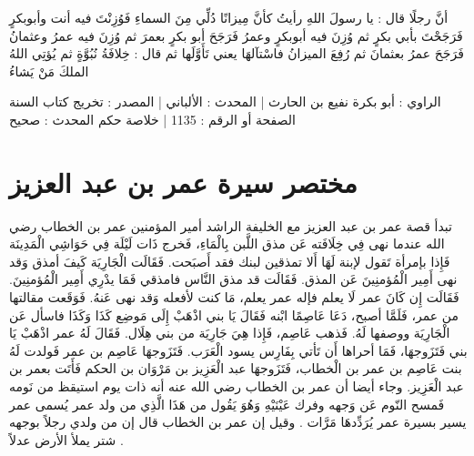 أنَّ رجلًا قال : يا رسولَ اللهِ رأيتُ كأنَّ مِيزانًا دُلِّي مِنَ السماءِ فَوُزِنْتَ فيه أنت وأبوبكرٍ فَرَجَحْتَ بأبي بكرٍ ثم وُزِنَ فيه أبوبكرٍ وعمرُ فَرَجَحَ أبو بكرٍ بعمرَ ثم وُزِنَ فيه عمرُ وعثمانُ فَرَجَحَ عمرُ بعثمانَ ثم رُفِعَ الميزانُ فاسْتآلهَا يعني تَأَوَّلَها ثم قال : خِلافَةُ نُبُوَّةٍ ثم يُؤتِي اللهُ الملكَ مَنْ يَشاءُ

الراوي : أبو بكرة نفيع بن الحارث | المحدث : الألباني | المصدر : تخريج كتاب السنة
الصفحة أو الرقم : 1135 | خلاصة حكم المحدث : صحيح 

\section{مختصر سيرة عمر بن عبد العزيز}

تبدأ قصة عمر بن عبد العزيز مع الخليفة الراشد أمير المؤمنين عمر بن الخطاب رضي الله عندما نهى فِي خِلَافَته عَن مذق اللَّبن بِالْمَاءِ، فَخرج ذَات لَيْلَة فِي حَوَاشِي الْمَدِينَة فَإِذا بإمرأة تَقول لإبنة لَهَا أَلا تمذقين لبنك فقد أَصبَحت. فَقَالَت الْجَارِيَة كَيفَ أمذق وَقد نهى أَمِير الْمُؤمنِينَ عَن المذق. فَقَالَت قد مذق النَّاس فامذقي فَمَا يدْرِي أَمِير الْمُؤمنِينَ. فَقَالَت إِن كَانَ عمر لَا يعلم فإله عمر يعلم، مَا كنت لأفعله وَقد نهى عَنهُ. فَوَقَعت مقالتها من عمر، فَلَمَّا أصبح، دَعَا عَاصِمًا ابْنه فَقَالَ يَا بني اذْهَبْ إِلَى مَوضِع كَذَا وَكَذَا فاسأل عَن الْجَارِيَة ووصفها لَهُ. فَذهب عَاصِم، فَإِذا هِيَ جَارِيَة من بني هِلَال. فَقَالَ لَهُ عمر اذْهَبْ يَا بني فَتَزَوجهَا، فَمَا أحراها أَن تَأتي بِفَارِس يسود الْعَرَب. فَتَزَوجهَا عَاصِم بن عمر فَولدت لَهُ بنت عَاصِم بن عمر بن الْخطاب، فَتَزَوجهَا عبد الْعَزِيز بن مَرْوَان بن الحكم فَأَتَت بعمر بن عبد الْعَزِيز. وجاء أيضا أن عمر بن الخطاب رضي الله عنه أنه ذات يوم استيقظ من نَومه فَمسح النّوم عَن وَجهه وفرك عَيْنَيْهِ وَهُوَ يَقُول من هَذَا الَّذِي من ولد عمر يُسمى عمر يسير بسيرة عمر يُرَدِّدهَا مَرَّات \cite{ibnAbdAlHakam_OmarIbnAbdAlAziz}. وقيل إن عمر بن الخطاب قال إن من ولدي رجلاً بوجهه شتر يملأ الأرض عدلاً \cite{dahabi_Siyar}.

